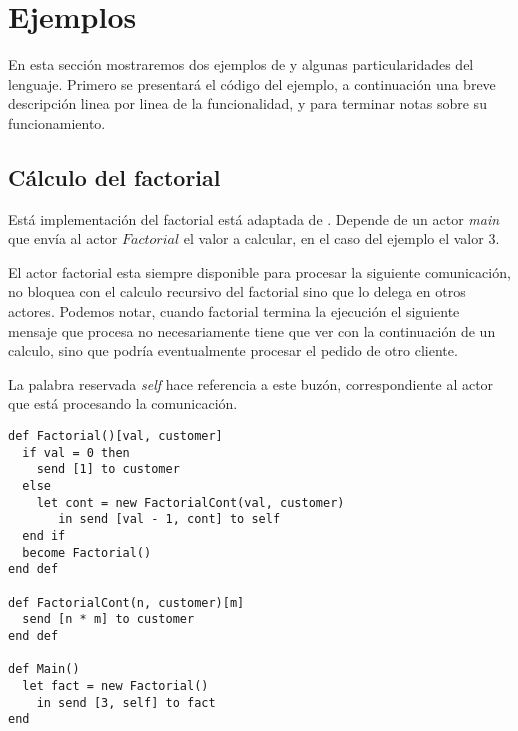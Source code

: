 \section{Ejemplos}

En esta sección mostraremos dos ejemplos de \SAL y algunas particularidades del lenguaje. Primero se presentará el código del ejemplo, a continuación una breve descripción linea por linea de la funcionalidad, y para terminar notas sobre su funcionamiento.

\subsection{Cálculo del factorial}\label{sal:factorial}

Está implementación del factorial está adaptada de \cite{Agha:1986:AMC:7929}. Depende de un actor \textit{main} que envía al actor $Factorial$ el valor a calcular, en el caso del ejemplo el valor $3$.

El actor factorial esta siempre disponible para procesar la siguiente comunicación, no bloquea con el calculo recursivo del factorial sino que lo delega en otros actores. Podemos notar, cuando factorial termina la ejecución el siguiente mensaje que procesa no necesariamente tiene que ver con la continuación de un calculo, sino que podría eventualmente procesar el pedido de otro cliente.

La palabra reservada \textit{self} hace referencia a este buzón, correspondiente al actor que está procesando la comunicación.

\begin{lstlisting}[language=sal, style=simple]
def Factorial()[val, customer]
  if val = 0 then
    send [1] to customer
  else
    let cont = new FactorialCont(val, customer)
       in send [val - 1, cont] to self
  end if 
  become Factorial()
end def

def FactorialCont(n, customer)[m] 
  send [n * m] to customer
end def

def Main() 
  let fact = new Factorial() 
    in send [3, self] to fact
end
\end{lstlisting}

